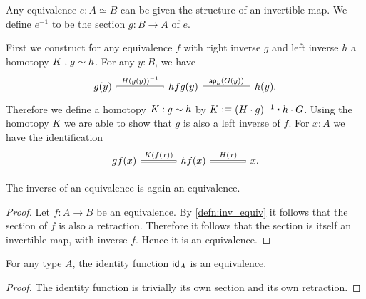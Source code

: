 \begin{defn}\label{defn:inv_equiv}
Any equivalence $e:A\simeq B$ can be given the structure of an invertible map. We define $e^{-1}$ to be the section $g:B\to A$ of $e$.
\end{defn}

\begin{constr}
First we construct for any equivalence $f$ with right inverse $g$ and left inverse $h$ a homotopy $K:g\htpy h$. For any $y:B$, we have 
\begin{equation*}
\begin{tikzcd}[column sep=huge]
g(y) \arrow[r,equals,"H(g(y))^{-1}"] & hfg(y) \arrow[r,equals,"\ap{h}{G(y)}"] & h(y).
\end{tikzcd}
\end{equation*} 
Therefore we define a homotopy $K:g\htpy h$ by $K\defeq \ct{(H\cdot g)^{-1}}{h\cdot G}$.
Using the homotopy $K$ we are able to show that $g$ is also a left inverse of $f$. For $x:A$ we have the identification
\begin{equation*}
\begin{tikzcd}[column sep=large]
gf(x) \arrow[r,equals,"K(f(x))"] & hf(x) \arrow[r,equals,"H(x)"] & x.
\end{tikzcd}\qedhere
\end{equation*}
\end{constr}

\begin{cor}
The inverse of an equivalence is again an equivalence.
\end{cor}

\begin{proof}
Let $f:A\to B$ be an equivalence. By \cref{defn:inv_equiv} it follows that the section of $f$ is also a retraction. Therefore it follows that the section is itself an invertible map, with inverse $f$. Hence it is an equivalence.
\end{proof}

\begin{thm}\label{thm:id_equiv}
For any type $A$, the identity function $\idfunc[A]$ is an equivalence.
\end{thm}

\begin{proof}
The identity function is trivially its own section and its own retraction.
\end{proof}

